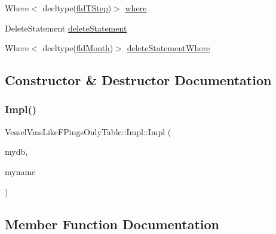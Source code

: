 \begin{DoxyCompactItemize}
\item 
Where$<$ decltype(\mbox{\hyperlink{struct_vessel_vms_like_f_pings_only_table_1_1_impl_ab44c7a92d60077b3a8ed4cb58ba99962}{fld\+T\+Step}})$>$ \mbox{\hyperlink{struct_vessel_vms_like_f_pings_only_table_1_1_impl_a36eca8cee27f25c20ba378ec82d34706}{where}}
\item 
Delete\+Statement \mbox{\hyperlink{struct_vessel_vms_like_f_pings_only_table_1_1_impl_a903916369d1c7c31fb331f8f9d494908}{delete\+Statement}}
\item 
Where$<$ decltype(\mbox{\hyperlink{struct_vessel_vms_like_f_pings_only_table_1_1_impl_a69548cc286384a7fa217ad5d28eb8db3}{fld\+Month}})$>$ \mbox{\hyperlink{struct_vessel_vms_like_f_pings_only_table_1_1_impl_afe2a29f9e7929e8dd378396dbd44f1be}{delete\+Statement\+Where}}
\end{DoxyCompactItemize}


\subsection{Constructor \& Destructor Documentation}
\mbox{\label{struct_vessel_vms_like_f_pings_only_table_1_1_impl_a23267685b6c588715bba2dfdafd1aee2}} 
\subsubsection{\texorpdfstring{Impl()}{Impl()}}
{\footnotesize\ttfamily Vessel\+Vms\+Like\+F\+Pings\+Only\+Table\+::\+Impl\+::\+Impl (\begin{DoxyParamCaption}\item[{std\+::shared\+\_\+ptr$<$ sqlite\+::\+S\+Q\+Lite\+Storage $>$}]{mydb,  }\item[{std\+::string}]{myname }\end{DoxyParamCaption})\hspace{0.3cm}{\ttfamily [inline]}}



\subsection{Member Function Documentation}
\mbox{\label{struct_vessel_vms_like_f_pings_only_table_1_1_impl_acdcd167cd07f861bf374a4ffa4ab4d11}} 
